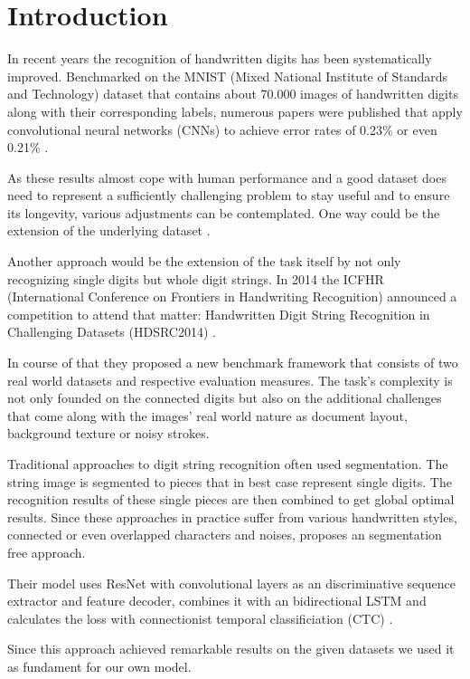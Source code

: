 \section{Introduction} \label{introduction}
In recent years the recognition of handwritten digits has been systematically improved. Benchmarked on the MNIST (Mixed National Institute of Standards and Technology)
dataset that contains about 70.000 images of handwritten digits along with their corresponding labels, numerous papers were published that apply convolutional neural networks (CNNs)
to achieve error rates of 0.23\% \cite{MNIST_2012} or even 0.21\% \cite{MNIST_boosting}.

As these results almost cope with human performance and a good dataset does need
to represent a sufficiently challenging problem to stay useful and to ensure its
longevity, various adjustments can be contemplated. One way could be the
extension of the underlying dataset \cite{EMNIST}.

Another approach would be the extension of the task itself by not only
recognizing single digits but whole digit strings. In 2014 the ICFHR
(International Conference on Frontiers in Handwriting Recognition) announced a
competition to attend that matter: Handwritten Digit String Recognition in
Challenging Datasets (HDSRC2014) \cite{icfhr_competition}.

In course of that they proposed a new benchmark framework that consists of two
real world datasets and respective evaluation measures. The task's complexity is
not only founded on the connected digits but also on the additional challenges
that come along with the images' real world nature as document layout,
background texture or noisy strokes. 

Traditional approaches to digit string recognition often used segmentation. The
string image is segmented to pieces that in best case represent single digits.
The recognition results of these single pieces are then combined to get global
optimal results. Since these approaches in practice suffer from various
handwritten styles, connected or even overlapped characters and noises,
\cite{zhan2017} proposes an segmentation free approach. 

Their model uses ResNet with convolutional layers \cite{ResNet} as an
discriminative sequence extractor and feature decoder, combines it with an
bidirectional LSTM and calculates the loss with connectionist temporal
classificiation (CTC) \cite{CTC}.

Since this approach achieved remarkable results on the given datasets we used it
as fundament for our own model.

